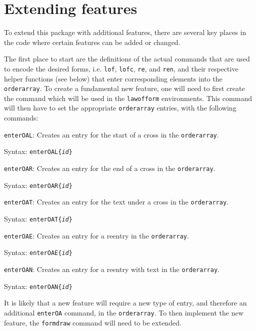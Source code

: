 \documentclass[12pt]{article}
\newenvironment{Description}[1]{%
	\begin{list}{nothing}{\setlength{\leftmargin}{#1}
			\setlength{\labelwidth}{\leftmargin}\setlength{\labelsep}{1mm}}}
	{\end{list}}
\newcommand{\BS}{\texttt{\symbol{`\\}}}
\newcommand{\Macro}[1]{\texttt{\BS#1}}
\newcommand{\FormatTeXMacro}[1]{\Macro{#1}\hfill :}
\begin{document}
\section{Extending features}

To extend this package with additional features, there are several key places in the code where certain features can be added or changed.

The first place to start are the definitions of the actual commands that are used to encode the desired forms, i.e. \Macro{lof}, \Macro{lofc}, \Macro{re}, and \Macro{ren}, and their respective helper functions (see below) that enter corresponding elements into the \Macro{orderarray}. To create a fundamental new feature, one will need to first create the command which will be used in the \Macro{lawofform} environments. This command will then have to set the appropriate \Macro{orderarray} entries, with the following commands:

\begin{Description}{4cm}
	\item[\FormatTeXMacro{enterOAL}] Creates an entry for the start of a cross in the \Macro{orderarray}.
	
	Syntax: \Macro{enterOAL\{\textit{id}\}}
	
	\item[\FormatTeXMacro{enterOAR}] Creates an entry for the end of a cross in the \Macro{orderarray}.
	
	Syntax: \Macro{enterOAR\{\textit{id}\}}
	
	\item[\FormatTeXMacro{enterOAT}] Creates an entry for the text under a cross in the \Macro{orderarray}.
	
	Syntax: \Macro{enterOAT\{\textit{id}\}}
	
	\item[\FormatTeXMacro{enterOAE}] Creates an entry for a reentry in the \Macro{orderarray}.
	
	Syntax: \Macro{enterOAE\{\textit{id}\}}
	
	\item[\FormatTeXMacro{enterOAN}] Creates an entry for a reentry with text in the \Macro{orderarray}.
	
	Syntax: \Macro{enterOAN\{\textit{id}\}}
\end{Description}

It is likely that a new feature will require a new type of entry, and therefore an additional \Macro{enterOA} command, in the \Macro{orderarray}. To then implement the new feature, the \Macro{formdraw} command will need to be extended.
\end{document}
